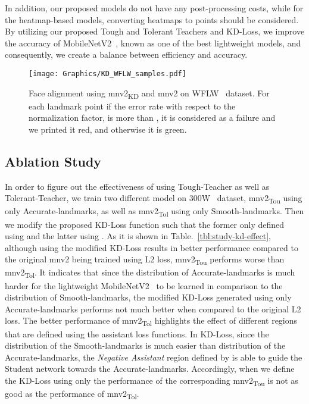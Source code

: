 \documentclass[times,twocolumn,final,authoryear]{elsarticle}
\begin{document}
In addition, our proposed models do not have any post-processing costs, while for the heatmap-based models, converting heatmaps to points should be considered. By utilizing our proposed Tough and Tolerant Teachers and KD-Loss, we improve the accuracy of MobileNetV2~\cite{sandler2018MobileNetV2}, known as one of the best lightweight models, and consequently, we create a balance between efficiency and accuracy.
\begin{figure*}[t]
  \centering
  \texttt{[image: Graphics/KD\_WFLW\_samples.pdf]}
  \caption{Face alignment using mnv2\textsubscript{KD} and mnv2 on WFLW~\cite{wu2018look} dataset. For each landmark point if the error rate with respect to the normalization factor, is more than , it is considered as a failure and we printed it red, and otherwise it is green.}
  \label{fig:wflw_samples_mn}
\end{figure*}


\subsection{Ablation Study}
In order to figure out the effectiveness of using Tough-Teacher as well as Tolerant-Teacher, we train two different model on 300W~\cite{sagonas2013300} dataset, mnv2\textsubscript{Tou} using only Accurate-landmarks, as well as mnv2\textsubscript{Tol} using only Smooth-landmarks. Then we modify the proposed KD-Loss function such that the former only defined using  and the latter using . As it is shown in Table.~\ref{tbl:study-kd-effect}, although using the modified KD-Loss results in better performance compared to the original mnv2 being trained using L2 loss, mnv2\textsubscript{Tou} performs worse than mnv2\textsubscript{Tol}. It indicates that since the distribution of Accurate-landmarks is much harder for the lightweight MobileNetV2~\cite{sandler2018MobileNetV2} to be learned in comparison to the distribution of Smooth-landmarks, the modified KD-Loss generated using only Accurate-landmarks performs not much better when compared to the original L2 loss. The better performance of mnv2\textsubscript{Tol} highlights the effect of different regions that are defined using the assistant loss functions. In KD-Loss, since the distribution of the Smooth-landmarks is much easier than distribution of the Accurate-landmarks, the \textit{Negative Assistant} region defined by  is able to guide the Student network towards the Accurate-landmarks. Accordingly, when we define the KD-Loss using only  the performance of the corresponding mnv2\textsubscript{Tou} is not as good as the performance of mnv2\textsubscript{Tol}.
\end{document}
